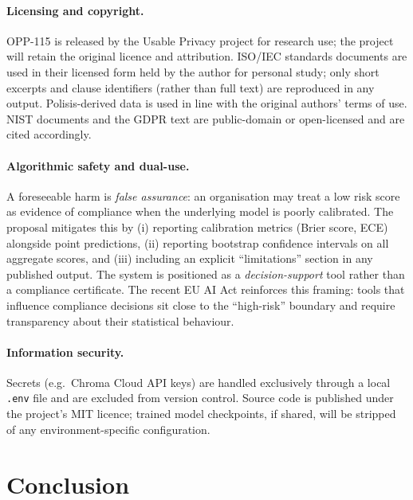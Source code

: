 \documentclass[12pt,a4paper,titlepage]{article}
\begin{document}
\paragraph{Licensing and copyright.} OPP-115 is released by the Usable Privacy project for research use; the project will retain the original licence and attribution. ISO/IEC standards documents are used in their licensed form held by the author for personal study; only short excerpts and clause identifiers (rather than full text) are reproduced in any output. Polisis-derived data is used in line with the original authors' terms of use. NIST documents and the GDPR text are public-domain or open-licensed and are cited accordingly.

\paragraph{Algorithmic safety and dual-use.} A foreseeable harm is \emph{false assurance}: an organisation may treat a low risk score as evidence of compliance when the underlying model is poorly calibrated. The proposal mitigates this by (i) reporting calibration metrics (Brier score, ECE) alongside point predictions, (ii) reporting bootstrap confidence intervals on all aggregate scores, and (iii) including an explicit ``limitations'' section in any published output. The system is positioned as a \emph{decision-support} tool rather than a compliance certificate. The recent EU AI Act \parencite{eu_ai_act_2024} reinforces this framing: tools that influence compliance decisions sit close to the ``high-risk'' boundary and require transparency about their statistical behaviour.

\paragraph{Information security.} Secrets (e.g.\ Chroma Cloud API keys) are handled exclusively through a local \texttt{.env} file and are excluded from version control. Source code is published under the project's MIT licence; trained model checkpoints, if shared, will be stripped of any environment-specific configuration.

\section{Conclusion}\label{sec:conclusion}
\end{document}
